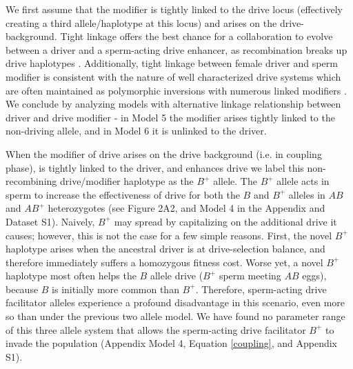 \documentclass{pnastwo}
\begin{document}
\begin{article}
We first assume that the modifier is tightly
        linked to the drive locus (effectively creating a third
        allele/haplotype at this locus) and arises on the drive-background. 
Tight linkage offers the best
        chance for a collaboration to evolve between a driver and
       a sperm-acting drive  enhancer, as recombination breaks up drive haplotypes \cite{Thomson1974,Charlesworth1978,Haig1991}. 
Additionally, tight linkage between female driver and sperm modifier is consistent with the nature of well characterized drive systems which are often maintained as polymorphic inversions with numerous linked modifiers \cite{Burt2006}. 
We conclude by analyzing models with alternative linkage relationship between driver and drive modifier - 
	in Model 5 the modifier arises tightly linked to the non-driving allele, 
	and in Model 6 it is unlinked to the driver. 


When the modifier of drive arises on the drive background (i.e. in coupling phase),
	is tightly linked to the driver, and enhances drive 
	we label  this non-recombining drive/modifier haplotype as the $B^+$ allele.  
The $B^+$ allele acts in sperm to increase the effectiveness of drive for both
	the $B$ and  $B^{+}$ alleles in $AB$ and $AB^{+}$ heterozygotes (see Figure 2A2, and Model 4 in the Appendix and Dataset S1). 
Naively, $B^{+}$ may spread by capitalizing on the additional drive it causes; however,  
	this is not the case for a few simple reasons. 
First, the novel $B^{+}$ haplotype
	arises when the ancestral driver 
	is at drive-selection balance, 
	and therefore immediately suffers a homozygous fitness cost.  
Worse yet, a novel $B^{+}$ haplotype most often helps 
	the $B$  allele drive ($B^+$ sperm meeting $AB$ eggs), because $B$ is initially more common than $B^{+}$. 
Therefore, sperm-acting drive facilitator alleles experience a profound disadvantage 
	in this scenario, even more so than under the previous two allele model. 
We have found no parameter range of this
	three allele system that allows the sperm-acting drive facilitator $B^{+}$ to
	invade the population (Appendix Model 4, Equation \eqref{coupling}, and Appendix S1). 


\end{article}
\end{document}
